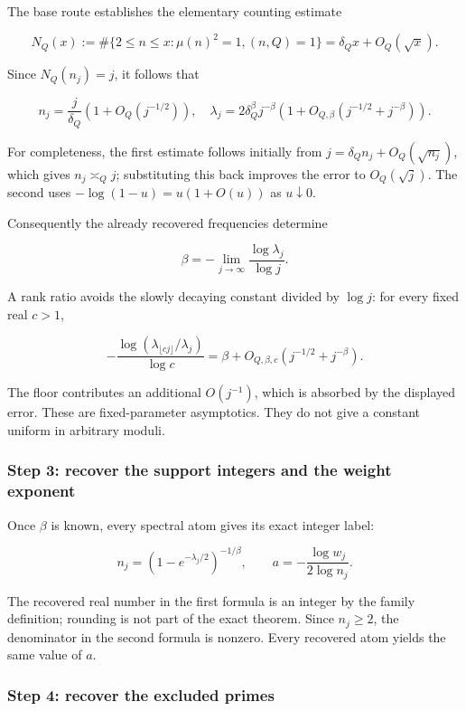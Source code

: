 The base route establishes the elementary counting estimate

\[
 N_Q(x):=\#\{2\le n\le x:\mu(n)^2=1,(n,Q)=1\}
       =\delta_Qx+O_Q(\sqrt{x}).
\]

Since \(N_Q(n_j)=j\), it follows that

\[
 n_j=\frac{j}{\delta_Q}\left(1+O_Q(j^{-1/2})\right),
 \quad
 \lambda_j=2\delta_Q^{\beta}j^{-\beta}
     \left(1+O_{Q,\beta}(j^{-1/2}+j^{-\beta})\right).
\]

For completeness, the first estimate follows initially from
\(j=\delta_Qn_j+O_Q(\sqrt{n_j})\), which gives \(n_j\asymp_Qj\);
substituting this back improves the error to \(O_Q(\sqrt j)\). The
second uses \(-\log(1-u)=u(1+O(u))\) as \(u\downarrow0\).

Consequently the already recovered frequencies determine

\[
 \boxed{\displaystyle
 \beta=-\lim_{j\to\infty}\frac{\log\lambda_j}{\log j}.}
\]

A rank ratio avoids the slowly decaying constant divided by \(\log j\):
for every fixed real \(c>1\),

\[
 -\frac{\log(\lambda_{\lfloor cj\rfloor}/\lambda_j)}{\log c}
 =\beta+O_{Q,\beta,c}(j^{-1/2}+j^{-\beta}).
\]

The floor contributes an additional \(O(j^{-1})\), which is absorbed by
the displayed error. These are fixed-parameter asymptotics. They do not
give a constant uniform in arbitrary moduli.

\hypertarget{step-3-recover-the-support-integers-and-the-weight-exponent}{%
\subsubsection{Step 3: recover the support integers and the weight
exponent}\label{step-3-recover-the-support-integers-and-the-weight-exponent}}

Once \(\beta\) is known, every spectral atom gives its exact integer
label:

\[
 \boxed{\displaystyle
 n_j=(1-e^{-\lambda_j/2})^{-1/\beta},\qquad
 a=-\frac{\log w_j}{2\log n_j}.}
\]

The recovered real number in the first formula is an integer by the
family definition; rounding is not part of the exact theorem. Since
\(n_j\ge2\), the denominator in the second formula is nonzero. Every
recovered atom yields the same value of \(a\).

\hypertarget{step-4-recover-the-excluded-primes}{%
\subsubsection{Step 4: recover the excluded
primes}\label{step-4-recover-the-excluded-primes}}

